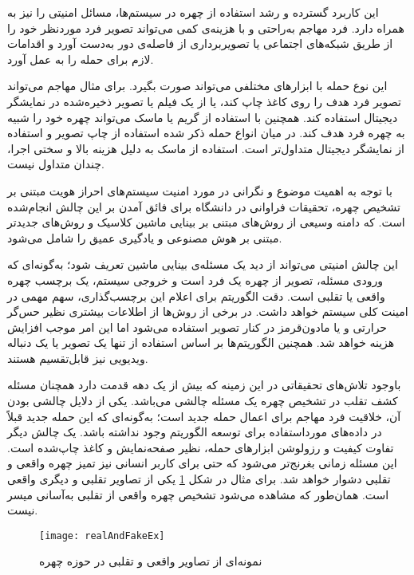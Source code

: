 این کاربرد گسترده و رشد استفاده از چهره در سیستم‌ها، مسائل امنیتی را نیز به همراه دارد. فرد مهاجم به‌راحتی و با هزینه‌ی کمی می‌تواند تصویر فرد مورد‌نظر خود را از طریق شبکه‌های اجتماعی یا تصویر‌برداری از فاصله‌ی دور به‌دست آورد و اقدامات لازم برای حمله را به عمل آورد.

این نوع حمله با ابزارهای مختلفی می‌تواند صورت بگیرد. برای مثال مهاجم می‌تواند تصویر فرد هدف را روی کاغذ چاپ کند، یا از یک فیلم یا تصویر ذخیره‌شده در نمایشگر دیجیتال استفاده کند. همچنین با استفاده از گریم یا ماسک می‌تواند چهره خود را شبیه به چهره فرد هدف کند. در میان انواع حمله ذکر شده استفاده از چاپ تصویر و استفاده از نمایشگر دیجیتال متداول‌تر است. استفاده از ماسک به دلیل هزینه بالا و سختی اجرا، چندان متداول نیست.

 با توجه به اهمیت موضوع و نگرانی در مورد امنیت سیستم‌های احراز هویت مبتنی بر تشخیص چهره، تحقیقات فراوانی در دانشگاه برای فائق آمدن بر این چالش انجام‌شده است. که دامنه وسیعی از روش‌های مبتنی بر بینایی ماشین کلاسیک و روش‌های جدیدتر مبتنی بر هوش مصنوعی و یادگیری عمیق را شامل می‌شود.

این چالش امنیتی می‌تواند از دید یک مسئله‌ی بینایی ماشین تعریف شود؛ به‌گونه‌ای که ورودی مسئله، تصویر از چهره یک فرد است و خروجی سیستم، یک برچسب چهره واقعی یا تقلبی است. دقت الگوریتم برای اعلام این برچسب‌گذاری، سهم مهمی در امینت کلی سیستم خواهد داشت. در برخی از روش‌ها از اطلاعات بیشتری نظیر حس‌گر حرارتی و یا مادون‌قرمز در کنار تصویر استفاده می‌شود اما این امر موجب افزایش هزینه خواهد شد. همچنین الگوریتم‌ها بر اساس استفاده از تنها یک تصویر یا یک دنباله ویدیویی نیز قابل‌تقسیم هستند.


با‌وجود تلاش‌های تحقیقاتی در این زمینه که بیش از یک دهه قدمت دارد همچنان مسئله کشف تقلب در تشخیص چهره یک مسئله چالشی می‌باشد. یکی از دلایل چالشی بودن آن، خلاقیت فرد مهاجم برای اعمال حمله جدید است؛ به‌گونه‌ای که این  حمله جدید قبلاً در داده‌های مورد‌استفاده برای توسعه الگوریتم وجود نداشته باشد. یک چالش دیگر تفاوت کیفیت و رزولوشن ابزارهای حمله، نظیر صفحه‌نمایش و کاغذ چاپ‌شده است. این مسئله زمانی بغرنج‌تر می‌شود که حتی برای کاربر انسانی نیز تمیز چهره واقعی و تقلبی دشوار خواهد شد. برای مثال در شکل 
\ref{fig:realandfake}
یکی از تصاویر تقلبی و دیگری واقعی است. همان‌طور که مشاهده می‌شود تشخیص چهره واقعی از تقلبی به‌آسانی میسر نیست.


\begin{figure}[ht]
	\centerline{\texttt{[image: realAndFakeEx]}}
	\caption{نمونه‌ای از تصاویر واقعی و تقلبی در حوزه چهره \cite{boulkenafet2017oulu}}
	\label{fig:realandfake}
\end{figure}

